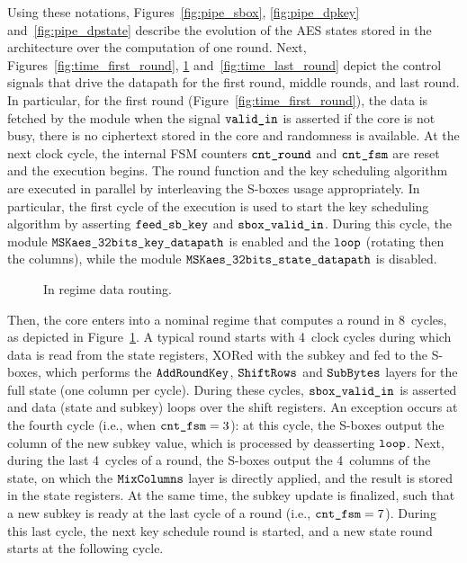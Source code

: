 \documentclass{scrartcl}
\begin{document}
Using these notations, Figures~\ref{fig:pipe_sbox}, \ref{fig:pipe_dpkey}
and~\ref{fig:pipe_dpstate} describe the evolution of the AES states stored in
the architecture over the computation of one round.
Next, Figures~\ref{fig:time_first_round}, \ref{fig:time_regime}
and~\ref{fig:time_last_round} depict the control signals that drive the
datapath for the first round, middle rounds, and last round.
In particular, for the first round (Figure~\ref{fig:time_first_round}), the
data is fetched by the module when the signal $\texttt{valid\_in}$ is asserted if
the core is not busy, there is no ciphertext stored in the core and randomness
is available.
At the next clock cycle, the
internal FSM counters $\texttt{cnt\_round}$ and $\texttt{cnt\_fsm}$ are reset and the
execution begins. The round function and the key scheduling algorithm are
executed in parallel by interleaving the S-boxes usage appropriately. In
particular, the first cycle of the execution is used to start the key
scheduling algorithm by asserting $\texttt{feed\_sb\_key}$ and $\texttt{sbox\_valid\_in}$.
During this cycle, the module $\texttt{MSKaes\_32bits\_key\_datapath}$ is enabled and the
$\texttt{loop}$ (rotating then the columns), while the module $\texttt{MSKaes\_32bits\_state\_datapath}$
is disabled.

\begin{figure}
    \centering
     
    \caption{In regime data routing.}
    \label{fig:time_regime}
\end{figure}

Then, the core enters into a nominal regime that computes a round in 8~cycles,
as depicted in Figure~\ref{fig:time_regime}.
A typical round starts with 4~clock cycles during which data is read from the
state registers, XORed with the subkey and fed to the S-boxes, which performs
the $\texttt{AddRoundKey}$, $\texttt{ShiftRows}$ and $\texttt{SubBytes}$ layers for the full state (one column per cycle).
During these cycles, $\texttt{sbox\_valid\_in}$ is asserted and data (state and subkey)
loops over the shift registers. An exception occurs at the fourth cycle (i.e., when $\texttt{cnt\_fsm}=3$): at this cycle, the S-boxes
output the column of the new subkey value, which is processed by deasserting $\texttt{loop}$.  
Next, during the last 4~cycles of a round, the S-boxes output the 4~columns of
the state, on which the $\texttt{MixColumns}$ layer is directly applied, and the result is
stored in the state registers. At the same time, the subkey update is
finalized, such that a new subkey is ready at the last cycle of a round (i.e.,
$\texttt{cnt\_fsm}=7$). During this last cycle, the next key schedule round is
started, and a new state round starts at the following cycle. 
\end{document}
